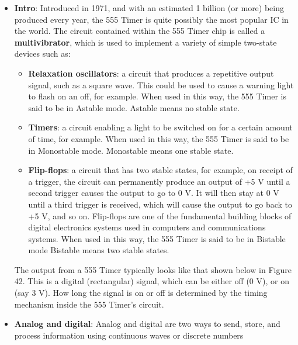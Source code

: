 \documentclass{report}
\begin{document}
    \pagebreak 
    \begin{itemize}
        \item \textbf{Intro}: Introduced in 1971, and with an estimated 1 billion (or more) being produced every year, the 555 Timer is quite possibly the most popular IC in the world. 
            \bigbreak \noindent 
            The circuit contained within the 555 Timer chip is called a \textbf{multivibrator}, which is used to implement a variety of simple two-state devices such as:
            \begin{itemize}
                \item \textbf{Relaxation oscillators}: a circuit that produces a repetitive output signal, such as a square wave. This could be used to cause a warning light to flash on an off, for example. When used in this way, the 555 Timer is said to be in Astable mode.
                    \bigbreak \noindent 
                    Astable means no stable state.
                \item \textbf{Timers}: a circuit enabling a light to be switched on for a certain amount of time, for example. When used in this way, the 555 Timer is said to be in Monostable mode.
                    \bigbreak \noindent 
                    Monostable means one stable state.
                \item \textbf{Flip-flops}: a circuit that has two stable states, for example, on receipt of a trigger, the circuit can permanently produce an output of +5 V until a second trigger causes the output to go to 0 V. It will then stay at 0 V until a third trigger is received, which will cause the output to go back to +5 V, and so on. Flip-flops are one of the fundamental building blocks of digital electronics systems used in computers and communications systems. When used in this way, the 555 Timer is said to be in Bistable mode
                    \bigbreak \noindent 
                    Bistable means two stable states.
            \end{itemize}
            The output from a 555 Timer typically looks like that shown below in Figure 42. This is a digital (rectangular) signal, which can be either off (0 V), or on (say 3 V). How long the signal is on or off is determined by the timing mechanism inside the 555 Timer's circuit.
            \bigbreak \noindent 
        \item \textbf{Analog and digital}: Analog and digital are two ways to send, store, and process information using continuous waves or discrete numbers

\end{itemize}
\end{document}
